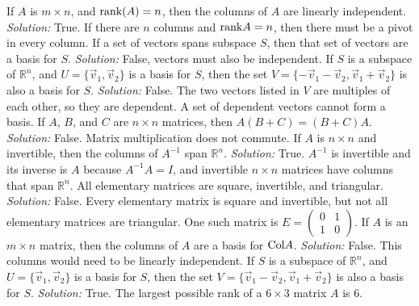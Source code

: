 \ifnum {}         
    If $A$ is $m\times n$, and $\text{rank} (A) = n$, then the columns of $A$ are linearly independent.
    \ifnum {} {\color{DarkBlue} \textit{Solution:  } True. If there are $n$ columns and $\text{rank} A = n$, then there must be a pivot in every column. } \fi
\fi
\ifnum {}      
     If a set of vectors spans subspace $S$, then that set of vectors are a basis for $S$.
    \ifnum {} {\color{DarkBlue} \textit{Solution:  } False, vectors must also be independent. } \fi
\fi    
\ifnum {}  
    If $S$ is a subspace of $\mathbb R^n$, and $U= \{\vec v_1 , \vec v_2\}$ is a basis for $S$, then the set $V=\{-\vec v_1 - \vec v_2, \vec v_1 + \vec v_2\}$ is also a basis for $S$.
    \ifnum {} {\color{DarkBlue} \textit{Solution:  } False. The two vectors listed in $V$ are multiples of each other, so they are dependent. A set of dependent vectors cannot form a basis. } \fi
\fi    
\ifnum {}    
    If $A$, $B$, and $C$ are $n\times n$ matrices, then $A(B+C) = (B+C)A$. 
    \ifnum {} {\color{DarkBlue} \textit{Solution:} False. Matrix multiplication does not commute. } \fi
\fi   
\ifnum {}    
    If $ A $ is $n\times n$ and invertible, then the columns of $ A ^{-1}$ span $ \mathbb R ^{n}$. 
    \ifnum {} {\color{DarkBlue} \textit{Solution:  } True. $A^{-1}$ is invertible and its inverse is $A$ because $A^{-1}A = I$, and invertible $n\times n$ matrices have columns that span $\mathbb R^n$.} \fi
\fi    
\ifnum {}      
    All elementary matrices are square, invertible, and triangular.
    \ifnum {} {\color{DarkBlue} \textit{Solution:  } False. Every elementary matrix is square and invertible, but not all elementary matrices are triangular. One such matrix is \setlength{\extrarowheight}{0.0cm} $E = \begin{pmatrix} 0&1\\1&0\end{pmatrix}$. } \fi
\fi        
\ifnum {} 
    If $A$ is an $m \times n$ matrix, then the columns of $A$ are a basis for $\text{Col} A$. 
    \ifnum {} {\color{DarkBlue} \textit{Solution:} False. 
    This columns would need to be linearly independent.} \fi
\fi     
\ifnum {}
     If $S$ is a subspace of $\mathbb R^n$, and $U= \{\vec v_1 , \vec v_2\}$ is a basis for $S$, then the set $V=\{\vec v_1 - \vec v_2, \vec v_1 + \vec v_2\}$ is also a basis for $S$.
    \ifnum {} {\color{DarkBlue} \textit{Solution:  } True.  }
    \fi
\fi     
\ifnum {}
    The largest possible rank of a $6 \times 3$ matrix $A$ is $6$. 
